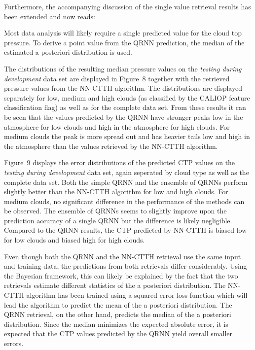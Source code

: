 \documentclass[journal abbreviation, manuscript]{copernicus}
\begin{document}
Furthermore, the accompanying discussion of the single value retrieval results
has been extended and now reads:

\vspace{1em}

\begin{em}
Most data analysis will likely require a single predicted value for the cloud top
pressure. To derive a point value from the QRNN prediction, the median of the
estimated a posteriori distribution is used.

The distributions of the resulting median pressure values 
on the \textit{testing during development} data set are displayed in
Figure~8 together with the retrieved pressure
values from the NN-CTTH algorithm. The distributions are displayed
separately for low, medium and high clouds (as classified by the CALIOP
feature classification flag) as well as for the complete data set. From these
results it can be seen that the values predicted by the QRNN have stronger peaks
low in the atmosphere for low clouds and high in the atmosphere for
high clouds. For medium clouds the peak is more spread out and has heavier
tails low and high in the atmosphere than the values retrieved by the NN-CTTH
algorithm.

Figure~9 displays the error distributions of the predicted
CTP values on the \textit{testing during development} data set, again seperated by
cloud type as well as the complete data set. Both the simple QRNN and the ensemble
of QRNNs perform slightly better than the NN-CTTH algorithm for low and high clouds.
For medium clouds, no significant difference in the performance of the methods can
be observed. The ensemble of QRNNs seems to slightly improve upon the prediction
accuracy of a single QRNN but the difference is likely negligible. Compared to
the QRNN results, the CTP predicted by NN-CTTH is biased low for low clouds and
biased high for high clouds.

Even though both the QRNN and the NN-CTTH retrieval use the same input and
training data, the predictions from both retrievals differ considerably. Using
the Bayesian framework, this can likely be explained by the fact that the two
retrievals estimate different statistics of the a posteriori distribution. The
NN-CTTH algorithm has been trained using a squared error loss function which
will lead the algorithm to predict the mean of the a posteriori distribution.
The QRNN retrieval, on the other hand, predicts the median of the a posteriori
distribution. Since the median minimizes the expected absolute error, it is
expected that the CTP values predicted by the QRNN yield overall smaller errors.
\end{em}
\end{document}

